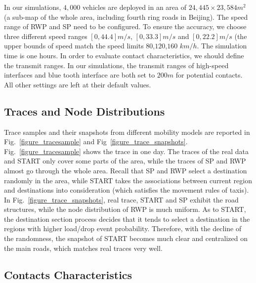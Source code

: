 In our simulations, $4,000$ vehicles are deployed in an area of $24,445\times 23,584 m^2$ (a sub-map of the whole area, including fourth ring roads in Beijing). The speed range of RWP and SP need to be configured.
To ensure the accuracy, we choose three different speed ranges $[0,44.4]m/s$, $[0,33.3]m/s$ and $[0,22.2]m/s$ (the upper bounds of speed match the speed limits $80$,$120$,$160$ $km/h$. 
The simulation time is one hours.
In order to evaluate contact characteristics, we should define the transmit ranges.
In our simulations, the transmit ranges of high-speed interfaces and blue tooth interface are both set to $200m$ for potential contacts.
All other settings are left at their default values.


\subsection{Traces and Node Distributions}

Trace samples and their snapshots from different mobility models are reported in Fig.~\ref{figure_tracesample} and Fig~\ref{figure_trace_snapshots}. Fig.~\ref{figure_tracesample} shows the trace in one day. The traces of the real data and START only cover some parts of the area, while the traces of SP and RWP almost go through the whole area. Recall that SP and RWP select a destination randomly in the area, while START takes the associations between current region and destinations into consideration (which satisfies the movement rules of taxis). In Fig.~\ref{figure_trace_snapshots}, real trace, START and SP exhibit the road structures, while the node distribution of RWP is much uniform. As to START, the destination section process decides that it tends to select a destination in the regions with higher load/drop event probability. Therefore, with the decline of the randomness, the snapshot of START becomes much clear and centralized on the main roads, which matches real traces very well.


\subsection{Contacts Characteristics}

